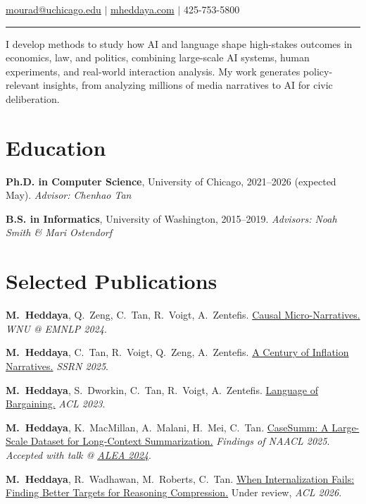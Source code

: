 \documentclass[11pt,letterpaper]{article}
\begin{document}
\hfill{\normalsize \href{mailto:mourad@uchicago.edu}{mourad@uchicago.edu} $|$ \href{https://mheddaya.com}{mheddaya.com} $|$ 425-753-5800}
\vspace{2pt}
\hrule

\vspace{10pt}
\noindent I develop methods to study how AI and language shape high-stakes outcomes in economics, law, and politics, combining large-scale AI systems, human experiments, and real-world interaction analysis. My work generates policy-relevant insights, from analyzing millions of media narratives to AI for civic deliberation.

\section*{Education}

\noindent\textbf{Ph.D. in Computer Science}, University of Chicago, 2021--2026 (expected May). \textit{Advisor: Chenhao Tan}

\vspace{4pt}

\noindent\textbf{B.S. in Informatics}, University of Washington, 2015--2019. \textit{Advisors: Noah Smith \& Mari Ostendorf}

\section*{Selected Publications}
\vspace{4pt}
\begin{enumerate}[label={[\arabic*]}, leftmargin=2em, topsep=2pt, itemsep=1pt, parsep=0pt]
    \item \textbf{M.\ Heddaya}, Q.\ Zeng, C.\ Tan, R.\ Voigt, A.\ Zentefis. \href{https://aclanthology.org/2024.wnu-1.12/}{Causal Micro-Narratives.} \textit{WNU @ EMNLP 2024}.
    \item \textbf{M.\ Heddaya}, C.\ Tan, R.\ Voigt, Q.\ Zeng, A.\ Zentefis. \href{https://papers.ssrn.com/sol3/papers.cfm?abstract_id=5259107}{A Century of Inflation Narratives.} \textit{SSRN 2025}.
    \item \textbf{M.\ Heddaya}, S.\ Dworkin, C.\ Tan, R.\ Voigt, A.\ Zentefis. \href{https://aclanthology.org/2023.acl-long.735/}{Language of Bargaining.} \textit{ACL 2023}.
    \item \textbf{M.\ Heddaya}, K.\ MacMillan, A.\ Malani, H.\ Mei, C.\ Tan. \href{https://arxiv.org/abs/2501.00097}{CaseSumm: A Large-Scale Dataset for Long-Context Summarization.} \textit{Findings of NAACL 2025}. \textit{Accepted with talk @ \href{https://www.amlecon.org}{ALEA 2024}}.
    \item \textbf{M.\ Heddaya}, R.\ Wadhawan, M.\ Roberts, C.\ Tan. \href{https://mheddaya.com/papers/acl2026_abridge.pdf}{When Internalization Fails: Finding Better Targets for Reasoning Compression.} Under review, \textit{ACL 2026}.
\end{enumerate}
\end{document}
